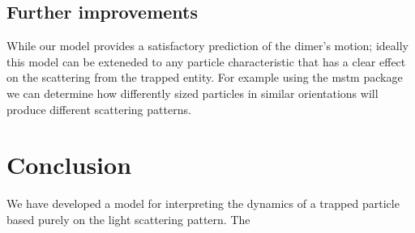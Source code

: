 \documentclass[11pt]{article}
\begin{document}
\subsection*{Further improvements}
While our model provides a satisfactory prediction of the dimer's motion; ideally this model can be exteneded to any particle characteristic that has a clear effect on the scattering from the trapped entity. For example using the mstm package we can determine how differently sized particles in similar orientations will produce different scattering patterns.  

\section*{Conclusion}
We have developed a model for interpreting the dynamics of a trapped particle based purely on the light scattering pattern. The 



\end{document}
